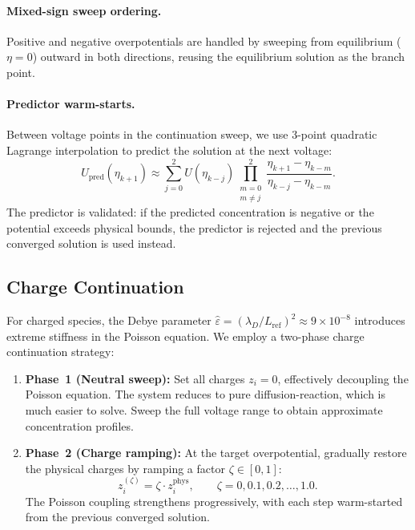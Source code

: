 \documentclass[11pt,a4paper]{article}
\begin{document}
\paragraph{Mixed-sign sweep ordering.}
Positive and negative overpotentials are handled by sweeping from
equilibrium ($\eta=0$) outward in both directions, reusing the
equilibrium solution as the branch point.

\paragraph{Predictor warm-starts.}
Between voltage points in the continuation sweep, we use 3-point
quadratic Lagrange interpolation to predict the solution at the next
voltage:
\begin{equation}\label{eq:predictor}
  U_{\text{pred}}(\eta_{k+1}) \approx \sum_{j=0}^{2}
    U(\eta_{k-j}) \prod_{\substack{m=0\\m\neq j}}^{2}
    \frac{\eta_{k+1} - \eta_{k-m}}{\eta_{k-j} - \eta_{k-m}}.
\end{equation}
The predictor is validated: if the predicted concentration is negative or
the potential exceeds physical bounds, the predictor is rejected and the
previous converged solution is used instead.

\subsection{Charge Continuation}\label{sec:charge_cont}

For charged species, the Debye parameter
$\hat{\varepsilon} = (\lambda_D / L_{\mathrm{ref}})^2 \approx 9\times10^{-8}$
introduces extreme stiffness in the Poisson equation. We employ a
two-phase charge continuation strategy:

\begin{enumerate}
  \item \textbf{Phase~1 (Neutral sweep):} Set all charges $z_i = 0$,
    effectively decoupling the Poisson equation. The system reduces to
    pure diffusion-reaction, which is much easier to solve. Sweep the
    full voltage range to obtain approximate concentration profiles.
  \item \textbf{Phase~2 (Charge ramping):} At the target overpotential,
    gradually restore the physical charges by ramping a factor
    $\zeta \in [0, 1]$:
    \begin{equation}
      z_i^{(\zeta)} = \zeta \cdot z_i^{\mathrm{phys}},
      \qquad \zeta = 0, 0.1, 0.2, \ldots, 1.0.
    \end{equation}
    The Poisson coupling strengthens progressively, with each step
    warm-started from the previous converged solution.
\end{enumerate}
\end{document}
